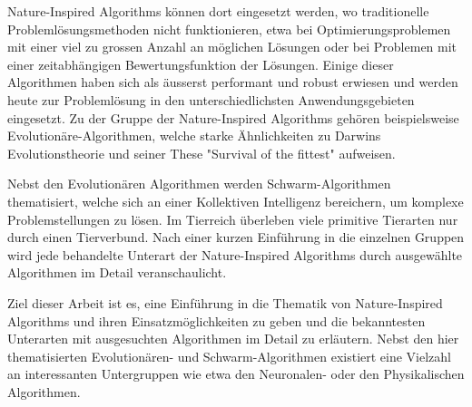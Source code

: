 % 
% 
%
Nature-Inspired Algorithms können dort eingesetzt werden, wo traditionelle
Problemlösungsmethoden nicht funktionieren, etwa bei Optimierungsproblemen mit einer
viel zu grossen Anzahl an möglichen Lösungen oder bei Problemen mit einer zeitabhängigen
Bewertungsfunktion der Lösungen. Einige dieser Algorithmen haben sich als äusserst performant
und robust erwiesen und werden heute zur Problemlösung in den unterschiedlichsten Anwendungsgebieten
eingesetzt.
Zu der Gruppe der Nature-Inspired Algorithms gehören beispielsweise Evolutionäre-Algorithmen, welche
starke Ähnlichkeiten zu Darwins Evolutionstheorie und seiner These "Survival of the fittest"
aufweisen.

Nebst den Evolutionären Algorithmen werden Schwarm-Algorithmen thematisiert, welche sich an einer
Kollektiven Intelligenz bereichern, um komplexe Problemstellungen zu lösen. Im Tierreich überleben
viele primitive Tierarten nur durch einen Tierverbund. Nach einer kurzen Einführung in die einzelnen Gruppen
wird jede behandelte Unterart der Nature-Inspired Algorithms durch ausgewählte Algorithmen im Detail
veranschaulicht.

Ziel dieser Arbeit ist es, eine Einführung in die Thematik von Nature-Inspired Algorithms und ihren
Einsatzmöglichkeiten zu geben und die bekanntesten Unterarten mit ausgesuchten Algorithmen im Detail
zu erläutern. Nebst den hier thematisierten Evolutionären- und Schwarm-Algorithmen existiert eine
Vielzahl an interessanten Untergruppen wie etwa den Neuronalen- oder den Physikalischen Algorithmen.
